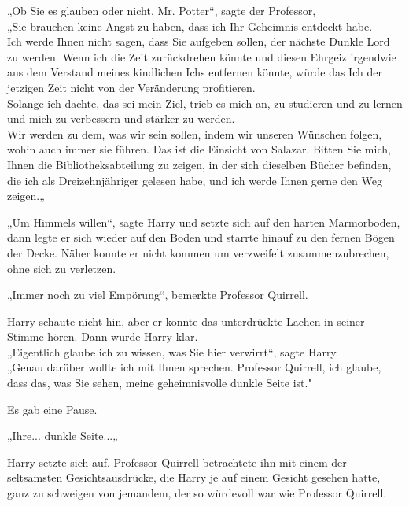 {„Ob Sie es glauben oder nicht, Mr. Potter“, sagte der Professor,\\ „Sie brauchen keine Angst zu haben, dass ich Ihr Geheimnis entdeckt habe.\\ Ich werde Ihnen nicht sagen, dass Sie aufgeben sollen, der nächste Dunkle Lord zu werden. Wenn ich die Zeit zurückdrehen könnte und diesen Ehrgeiz irgendwie aus dem Verstand meines kindlichen Ichs entfernen könnte, würde das Ich der jetzigen Zeit nicht von der Veränderung profitieren.\\ Solange ich dachte, das sei mein Ziel, trieb es mich an, zu studieren und zu lernen und mich zu verbessern und stärker zu werden.\\ Wir werden zu dem, was wir sein sollen, indem wir unseren Wünschen folgen, wohin auch immer sie führen. Das ist die Einsicht von Salazar. Bitten Sie mich, Ihnen die Bibliotheksabteilung zu zeigen, in der sich dieselben Bücher befinden, die ich als Dreizehnjähriger gelesen habe, und ich werde Ihnen gerne den Weg zeigen.„

„Um Himmels willen“, sagte Harry und setzte sich auf den harten Marmorboden, dann legte er sich wieder auf den Boden und starrte hinauf zu den fernen Bögen der Decke. Näher konnte er nicht kommen um verzweifelt zusammenzubrechen, ohne sich zu verletzen.

„Immer noch zu viel Empörung“, bemerkte Professor Quirrell.

Harry schaute nicht hin, aber er konnte das unterdrückte Lachen in seiner Stimme hören. Dann wurde Harry klar.\\ „Eigentlich glaube ich zu wissen, was Sie hier verwirrt“, sagte Harry.\\ „Genau darüber wollte ich mit Ihnen sprechen. Professor Quirrell, ich glaube, dass das, was Sie sehen, meine geheimnisvolle dunkle Seite ist."

Es gab eine Pause.

„Ihre... dunkle Seite...„

Harry setzte sich auf. Professor Quirrell betrachtete ihn mit einem der seltsamsten Gesichtsausdrücke, die Harry je auf einem Gesicht gesehen hatte, ganz zu schweigen von jemandem, der so würdevoll war wie Professor Quirrell.

}
